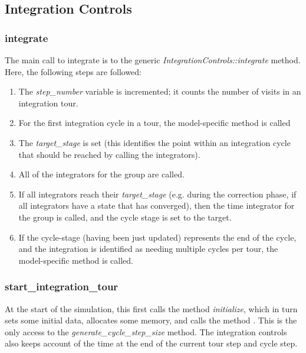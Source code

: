 \subsection{Integration Controls}\label{sec:GJ_Detailed_Design_Controls}

\subsubsection{integrate}
The main call to integrate is to the generic
\textit{IntegrationControls::integrate} method. Here, the following
steps are followed:

\begin{enumerate}
\item The \textit{step\_number} variable is incremented; it counts the number of
visits in an integration tour.
\item For the first integration cycle in a tour, the model-specific
method is called
\item The \textit{target\_stage} is set (this identifies the point
within an integration cycle that should be reached by calling the
integrators).
\item All of the integrators for the group are called.
\item If all integrators reach their \textit{target\_stage }(e.g. during
the correction phase, if all integrators have a state that has
converged), then the time integrator for the group is called, and the
cycle stage is set to the target.
\item If the cycle-stage (having been just updated) represents the end
of the cycle, and the integration is identified as needing multiple
cycles per tour, the model-specific method
 is called.
\end{enumerate}

\subsubsection{start\_integration\_tour}\label{ref:GJ_start_integration_tour}

At the start of the simulation, this first calls the method
\textit{initialize}, which in turn sets some initial data, allocates
some memory, and calls the method 
.
This is the only access to
the \textit{generate\_cycle\_step\_size} method. The integration
controls also keeps account of the time at the end of the current tour
step and cycle step.

